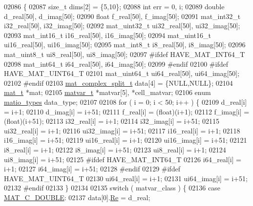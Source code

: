 \begin{DoxyCode}
{{{{{02086 \{
02087     \textcolor{keywordtype}{size\_t} dims[2] = \{5,10\};
02088     \textcolor{keywordtype}{int}    err = 0, i;
02089     \textcolor{keywordtype}{double}    d\_real[50], d\_imag[50];
02090     \textcolor{keywordtype}{float}     f\_real[50], f\_imag[50];
02091     mat\_int32\_t   i32\_real[50], i32\_imag[50];
02092     mat\_uint32\_t ui32\_real[50], ui32\_imag[50];
02093     mat\_int16\_t   i16\_real[50], i16\_imag[50];
02094     mat\_uint16\_t ui16\_real[50], ui16\_imag[50];
02095     mat\_int8\_t    i8\_real[50], i8\_imag[50];
02096     mat\_uint8\_t  ui8\_real[50], ui8\_imag[50];
02097 \textcolor{preprocessor}{#ifdef HAVE\_MAT\_INT64\_T}
02098     mat\_int64\_t i64\_real[50], i64\_imag[50];
02099 \textcolor{preprocessor}{#endif}
02100 \textcolor{preprocessor}{#ifdef HAVE\_MAT\_UINT64\_T}
02101     mat\_uint64\_t ui64\_real[50], ui64\_imag[50];
02102 \textcolor{preprocessor}{#endif}
02103     \hyperlink{group___m_a_t_structmat__complex__split__t}{mat\_complex\_split\_t} data[4] = \{NULL,NULL\};
02104     \hyperlink{struct__mat__t}{mat\_t} *mat;
02105     \hyperlink{group___m_a_t_structmatvar__t}{matvar\_t} *matvar[5], *cell\_matvar;
02106     \textcolor{keyword}{enum} \hyperlink{group___m_a_t_gacf7b3b879282b7ab3a51190e49bf3453}{matio\_types} data\_type;
02107 
02108     \textcolor{keywordflow}{for} ( i = 0; i < 50; i++ ) \{
02109           d\_real[i] = i+1;
02110           d\_imag[i] = i+51;
02111           f\_real[i] = (float)(i+1);
02112           f\_imag[i] = (float)(i+51);
02113         i32\_real[i] = i+1;
02114         i32\_imag[i] = i+51;
02115        ui32\_real[i] = i+1;
02116        ui32\_imag[i] = i+51;
02117         i16\_real[i] = i+1;
02118         i16\_imag[i] = i+51;
02119        ui16\_real[i] = i+1;
02120        ui16\_imag[i] = i+51;
02121          i8\_real[i] = i+1;
02122          i8\_imag[i] = i+51;
02123         ui8\_real[i] = i+1;
02124         ui8\_imag[i] = i+51;
02125 \textcolor{preprocessor}{#ifdef HAVE\_MAT\_INT64\_T}
02126         i64\_real[i] = i+1;
02127         i64\_imag[i] = i+51;
02128 \textcolor{preprocessor}{#endif}
02129 \textcolor{preprocessor}{#ifdef HAVE\_MAT\_UINT64\_T}
02130         ui64\_real[i] = i+1;
02131         ui64\_imag[i] = i+51;
02132 \textcolor{preprocessor}{#endif}
02133     \}
02134 
02135     \textcolor{keywordflow}{switch} ( matvar\_class ) \{
02136         \textcolor{keywordflow}{case} \hyperlink{group___m_a_t_ggad4d60ae7b709fc81bfd744fb4c857c40a5d70e0862e5bdb7bd86bf7ba5948f307}{MAT\_C\_DOUBLE}:
02137             data[0].\hyperlink{group___m_a_t_a484a93607508adac2bce53a0252e0325}{Re} = d\_real;
}}}}}
\end{DoxyCode}
